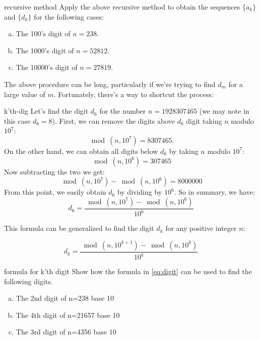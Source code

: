 \begin{exercise}{recursive method}
Apply the above recursive method to obtain the sequences $\{a_k\}$ and $\{d_k\}$ for the following cases:
\begin{enumerate}[(a)]
\item The 100's digit of $n=238$.
\item The 1000's digit of $n=52812$.
\item The 10000's digit of $ n=27819$.
\end{enumerate}
\end{exercise}


The above procedure can be long, particularly if we're trying to find $d_m$ for a large value of $m$.  Fortunately, there's a way to shortcut the process:

\begin{example}{k'th-dig}
Let's find the digit $d_6$ for the number $n=1928307465$ (we may note in this case $d_6=8$). First, we can remove the digits above $d_6$ digit taking $n$ modulo $10^7$:
\begin{equation*}
\bmod(n,10^{7})=8307465.
\end{equation*}
On the other hand, we can obtain all digits below $d_6$ by taking $n$ modulo $10^7$:
\begin{equation*}
\bmod(n,10^{6})=307465
\end{equation*}
Now subtracting the two we get:
\begin{equation*}
\bmod(n,10^{7}) - \bmod(n,10^{6})=8000000
\end{equation*}
From this point, we easily obtain $d_6$ by dividing by $10^6$.  So in summary, we have:
\begin{equation*}
d_6 = \frac{\bmod(n,10^7)-\bmod(n,10^6)}{10^6} 
\end{equation*}

\end{example}

This formula can be generalized to find the digit $d_k$ for any positive integer $n$:

\begin{equation}\label{eq:digit}
d_{k}=\frac{\bmod(n,10^{k+1})-\bmod(n,10^{k})}{10^{k}}
\end{equation}

\begin{exercise}{formula for k'th digit}
Show how the formula in \eqref{eq:digit} can be used to find the following digits.
\begin{enumerate}[(a)]
\item The 2nd digit of n=238 base 10
\item The 4th digit of n=21657 base 10
\item The 3rd digit of n=4356 base 10
\end{enumerate}
\end{exercise}

